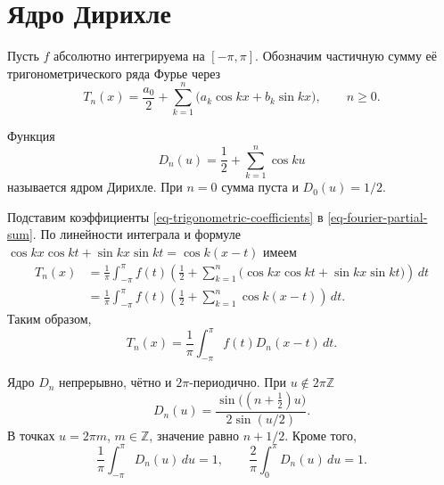 \section{Ядро Дирихле}\label{sec-fourier-dirichlet}

Пусть \(f\) абсолютно интегрируема на \([-\pi,\pi]\). Обозначим частичную сумму её тригонометрического ряда Фурье через
\begin{equation}
T_n(x)=\frac{a_0}{2}+\sum_{k=1}^n\bigl(a_k\cos kx+b_k\sin kx\bigr),
\qquad n\ge0.
\label{eq-fourier-partial-sum}
\end{equation}

\begin{definition}\label{def-dirichlet-kernel}

Функция
\begin{equation}
D_n(u)=\frac12+\sum_{k=1}^n\cos ku
\label{eq-dirichlet-kernel}
\end{equation}
называется ядром Дирихле. При \(n=0\) сумма пуста и \(D_0(u)=1/2\).

\end{definition}

Подставим коэффициенты \eqref{eq-trigonometric-coefficients} в \eqref{eq-fourier-partial-sum}. По линейности интеграла и формуле \(\cos kx\cos kt+\sin kx\sin kt=\cos k(x-t)\) имеем
\[
\begin{aligned}
T_n(x)
&=\frac1\pi\int_{-\pi}^{\pi}f(t)
\left(\frac12+\sum_{k=1}^n\bigl(\cos kx\cos kt+\sin kx\sin kt\bigr)\right)\,dt\\
&=\frac1\pi\int_{-\pi}^{\pi}f(t)
\left(\frac12+\sum_{k=1}^n\cos k(x-t)\right)\,dt.
\end{aligned}
\]
Таким образом,
\begin{equation}
T_n(x)=\frac1\pi\int_{-\pi}^{\pi}f(t)D_n(x-t)\,dt.
\label{eq-fourier-kernel-integral}
\end{equation}

\begin{lemma}\label{lem-dirichlet-properties}

Ядро \(D_n\) непрерывно, чётно и \(2\pi\)-периодично. При \(u\notin2\pi\mathbb Z\)
\begin{equation}
D_n(u)=\frac{\sin\bigl((n+\tfrac12)u\bigr)}{2\sin(u/2)}.
\label{eq-dirichlet-sine-form}
\end{equation}
В точках \(u=2\pi m\), \(m\in\mathbb Z\), значение равно \(n+1/2\). Кроме того,
\begin{equation}
\frac1\pi\int_{-\pi}^{\pi}D_n(u)\,du=1,
\qquad
\frac2\pi\int_0^\pi D_n(u)\,du=1.
\label{eq-dirichlet-normalization}
\end{equation}

\end{lemma}

